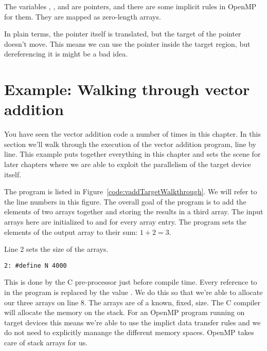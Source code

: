 The variables , , and  are pointers, and there are some implicit rules in OpenMP for them.
They are mapped as zero-length arrays.

In plain terms, the pointer itself is translated, but the target of the pointer doesn't move.
This means we can use the pointer inside the target region, but dereferencing it is might be a bad idea.


\section{Example: Walking through vector addition}
\label{sec:vadd_walkthrough}

You have seen the vector addition code a number of times in this chapter.
In this section we'll walk through the execution of the vector addition program, line by line.
This example puts together everything in this chapter and sets the scene for later chapters where we are able to exploit the parallelism of the target device itself.

The program is listed in Figure~\ref{code:vaddTargetWalkthrough}.
We will refer to the line numbers in this figure.
The overall goal of the program is to add the elements of two arrays together and storing the results in a third array.
The input arrays here are initialized to  and  for every array entry.
The program sets the elements of the output array to their sum: $1+2=3$.

Line 2 sets the size of the arrays.
\begin{verbatim}
2: #define N 4000
\end{verbatim}
This is done by the C pre-processor just before compile time.
Every reference to  in the program is replaced by the value .
We do this so that we're able to allocate our three arrays on line 8.
The arrays are of a known, fixed, size.
The C compiler will allocate the memory on the stack.
For an OpenMP program running on target devices this means we're able to use the implict data transfer rules and we do not need to explicitly manange the different memory spaces.
OpenMP takes care of stack arrays for us.


